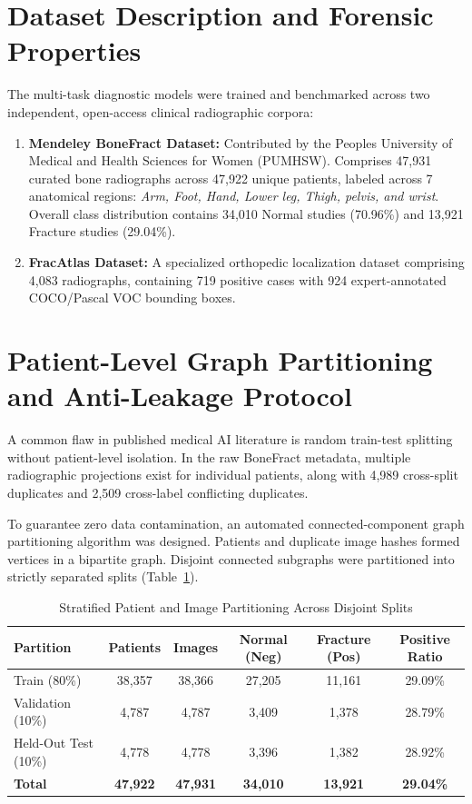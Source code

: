 \documentclass[12pt, a4paper]{report}
\begin{document}
\section{Dataset Description and Forensic Properties}
The multi-task diagnostic models were trained and benchmarked across two independent, open-access clinical radiographic corpora:
\begin{enumerate}[leftmargin=*]
    \item \textbf{Mendeley BoneFract Dataset:} Contributed by the Peoples University of Medical and Health Sciences for Women (PUMHSW). Comprises 47,931 curated bone radiographs across 47,922 unique patients, labeled across 7 anatomical regions: \textit{Arm, Foot, Hand, Lower leg, Thigh, pelvis, and wrist}. Overall class distribution contains 34,010 Normal studies (70.96\%) and 13,921 Fracture studies (29.04\%).
    \item \textbf{FracAtlas Dataset:} A specialized orthopedic localization dataset comprising 4,083 radiographs, containing 719 positive cases with 924 expert-annotated COCO/Pascal VOC bounding boxes.
\end{enumerate}

\section{Patient-Level Graph Partitioning and Anti-Leakage Protocol}
A common flaw in published medical AI literature is random train-test splitting without patient-level isolation. In the raw BoneFract metadata, multiple radiographic projections exist for individual patients, along with 4,989 cross-split duplicates and 2,509 cross-label conflicting duplicates.

To guarantee zero data contamination, an automated connected-component graph partitioning algorithm was designed. Patients and duplicate image hashes formed vertices in a bipartite graph. Disjoint connected subgraphs were partitioned into strictly separated splits (Table~\ref{tab:splits}).

\begin{table}[H]
\centering
\caption{Stratified Patient and Image Partitioning Across Disjoint Splits}
\label{tab:splits}
\begin{tabular}{lccccc}
\toprule
\textbf{Partition} & \textbf{Patients} & \textbf{Images} & \textbf{Normal (Neg)} & \textbf{Fracture (Pos)} & \textbf{Positive Ratio} \\
\midrule
Train (80\%) & 38,357 & 38,366 & 27,205 & 11,161 & 29.09\% \\
Validation (10\%) & 4,787 & 4,787 & 3,409 & 1,378 & 28.79\% \\
Held-Out Test (10\%) & 4,778 & 4,778 & 3,396 & 1,382 & 28.92\% \\
\midrule
\textbf{Total} & \textbf{47,922} & \textbf{47,931} & \textbf{34,010} & \textbf{13,921} & \textbf{29.04\%} \\
\bottomrule
\end{tabular}
\end{table}
\end{document}
